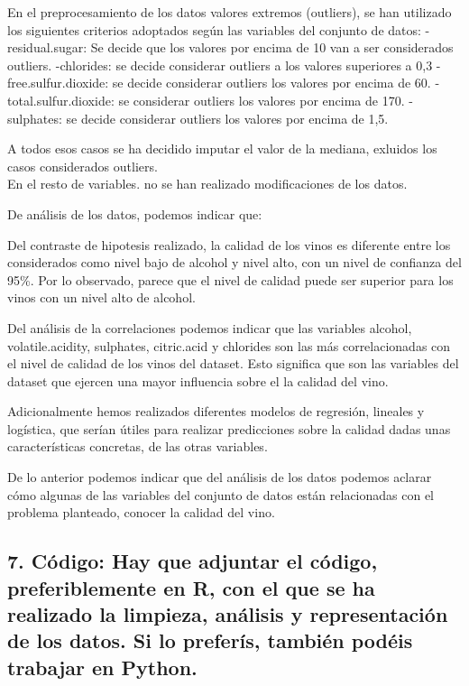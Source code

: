 \documentclass[
]{article}
\begin{document}
En el preprocesamiento de los datos valores extremos (outliers), se han
utilizado los siguientes criterios adoptados según las variables del
conjunto de datos: -residual.sugar: Se decide que los valores por encima
de 10 van a ser considerados outliers. -chlorides: se decide considerar
outliers a los valores superiores a 0,3 -free.sulfur.dioxide: se decide
considerar outliers los valores por encima de 60. -total.sulfur.dioxide:
se considerar outliers los valores por encima de 170. -sulphates: se
decide considerar outliers los valores por encima de 1,5.

A todos esos casos se ha decidido imputar el valor de la mediana,
exluidos los casos considerados outliers.\\
En el resto de variables. no se han realizado modificaciones de los
datos.

De análisis de los datos, podemos indicar que:

Del contraste de hipotesis realizado, la calidad de los vinos es
diferente entre los considerados como nivel bajo de alcohol y nivel
alto, con un nivel de confianza del 95\%. Por lo observado, parece que
el nivel de calidad puede ser superior para los vinos con un nivel alto
de alcohol.

Del análisis de la correlaciones podemos indicar que las variables
alcohol, volatile.acidity, sulphates, citric.acid y chlorides son las
más correlacionadas con el nivel de calidad de los vinos del dataset.
Esto significa que son las variables del dataset que ejercen una mayor
influencia sobre el la calidad del vino.

Adicionalmente hemos realizados diferentes modelos de regresión,
lineales y logística, que serían útiles para realizar predicciones sobre
la calidad dadas unas características concretas, de las otras variables.

De lo anterior podemos indicar que del análisis de los datos podemos
aclarar cómo algunas de las variables del conjunto de datos están
relacionadas con el problema planteado, conocer la calidad del vino.

\hypertarget{cuxf3digo-hay-que-adjuntar-el-cuxf3digo-preferiblemente-en-r-con-el-que-se-ha-realizado-la-limpieza-anuxe1lisis-y-representaciuxf3n-de-los-datos.-si-lo-preferuxeds-tambiuxe9n-poduxe9is-trabajar-en-python.}{%
\subsection{7. Código: Hay que adjuntar el código, preferiblemente en R,
con el que se ha realizado la limpieza, análisis y representación de los
datos. Si lo preferís, también podéis trabajar en
Python.}\label{cuxf3digo-hay-que-adjuntar-el-cuxf3digo-preferiblemente-en-r-con-el-que-se-ha-realizado-la-limpieza-anuxe1lisis-y-representaciuxf3n-de-los-datos.-si-lo-preferuxeds-tambiuxe9n-poduxe9is-trabajar-en-python.}}
\end{document}
